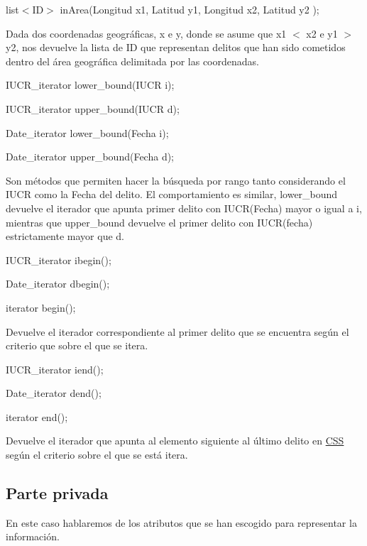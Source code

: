\begin{DoxyItemize}
\item list$<$\+I\+D$>$ in\+Area(\+Longitud x1, Latitud y1, Longitud x2, Latitud y2 );\end{DoxyItemize}
Dada dos coordenadas geográficas, x e y, donde se asume que x1 $<$ x2 e y1 $>$ y2, nos devuelve la lista de I\+D que representan delitos que han sido cometidos dentro del área geográfica delimitada por las coordenadas.

\begin{DoxyItemize}
\item I\+U\+C\+R\+\_\+iterator lower\+\_\+bound(\+I\+U\+C\+R i); \item I\+U\+C\+R\+\_\+iterator upper\+\_\+bound(\+I\+U\+C\+R d); \item Date\+\_\+iterator lower\+\_\+bound(\+Fecha i); \item Date\+\_\+iterator upper\+\_\+bound(\+Fecha d);\end{DoxyItemize}
Son métodos que permiten hacer la búsqueda por rango tanto considerando el I\+U\+C\+R como la Fecha del delito. El comportamiento es similar, lower\+\_\+bound devuelve el iterador que apunta primer delito con I\+U\+C\+R(\+Fecha) mayor o igual a i, mientras que upper\+\_\+bound devuelve el primer delito con I\+U\+C\+R(fecha) estrictamente mayor que d.

\begin{DoxyItemize}
\item I\+U\+C\+R\+\_\+iterator ibegin(); \item Date\+\_\+iterator dbegin(); \item iterator begin();\end{DoxyItemize}
Devuelve el iterador correspondiente al primer delito que se encuentra según el criterio que sobre el que se itera.

\begin{DoxyItemize}
\item I\+U\+C\+R\+\_\+iterator iend(); \item Date\+\_\+iterator dend(); \item iterator end();\end{DoxyItemize}
Devuelve el iterador que apunta al elemento siguiente al último delito en \hyperlink{classCSS}{C\+S\+S} según el criterio sobre el que se está itera.\hypertarget{index_privado}{}\subsection{Parte privada}\label{index_privado}
En este caso hablaremos de los atributos que se han escogido para representar la información.


